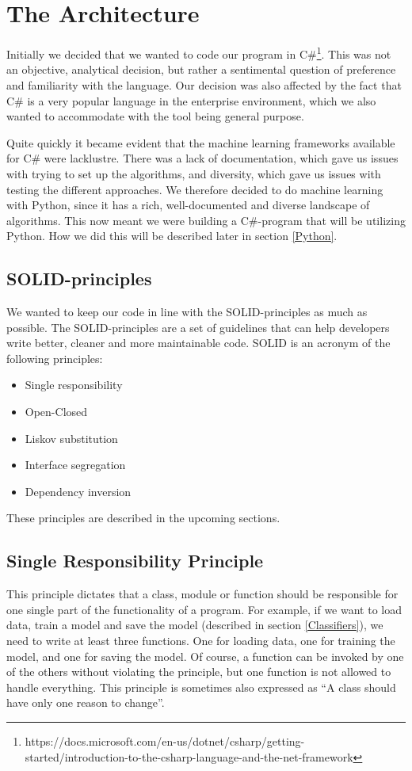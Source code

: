 \section{The Architecture} \label{The Architecture}

Initially we decided that we wanted to code our program in C\#\footnote{https://docs.microsoft.com/en-us/dotnet/csharp/getting-started/introduction-to-the-csharp-language-and-the-net-framework}. This was not an objective, analytical decision, but rather a sentimental question of preference and familiarity with the language. Our decision was also affected by the fact that C\# is a very popular language in the enterprise environment\cite{devstack}, which we also wanted to accommodate with the tool being general purpose.

Quite quickly it became evident that the machine learning frameworks available for C\# were lacklustre. There was a lack of documentation, which gave us issues with trying to set up the algorithms, and diversity, which gave us issues with testing the different approaches. We therefore decided to do machine learning with Python, since it has a rich, well-documented and diverse landscape of algorithms. This now meant we were building a C\#-program that will be utilizing Python. How we did this will be described later in section \ref{Python}.

\subsection{SOLID-principles} \label{SOLID-principles}

We wanted to keep our code in line with the SOLID-principles \cite{SOLID} as much as possible. The SOLID-principles are a set of guidelines that can help developers write better, cleaner and more maintainable code.
SOLID is an acronym of the following principles:
\begin{itemize}
    \item Single responsibility
    \item Open-Closed
    \item Liskov substitution
    \item Interface segregation
    \item Dependency inversion
\end{itemize}
These principles are described in the upcoming sections.

\subsection{Single Responsibility Principle}
This principle dictates that a class, module or function should be responsible for one single part of the functionality of a program. For example, if we want to load data, train a model and save the model (described in section \ref{Classifiers}), we need to write at least three functions. One for loading data, one for training the model, and one for saving the model. Of course, a function can be invoked by one of the others without violating the principle, but one function is not allowed to handle everything. This principle is sometimes also expressed as “A class should have only one reason to change”. \cite{SOLID}

